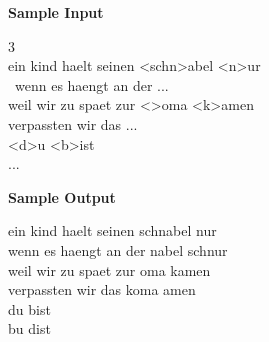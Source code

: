 \begin{flushleft}
{\color{red} \textbf{Sample Input}}
\end{flushleft}
\begin{flushleft}
3\\
ein kind haelt seinen \textless schn\textgreater abel \textless n\textgreater ur\\\
wenn es haengt an der ...\\
weil wir zu spaet zur \textless \textgreater oma \textless k\textgreater amen\\
verpassten wir das ...\\
\textless d\textgreater u \textless b\textgreater ist\\
...\\
\end{flushleft}

\begin{flushleft}
{\color{red} \textbf{Sample Output}}
\end{flushleft}
\begin{flushleft}
ein kind haelt seinen schnabel nur\\
wenn es haengt an der nabel schnur\\
weil wir zu spaet zur oma kamen\\
verpassten wir das koma amen\\
du bist\\
bu dist\\
\end{flushleft}

\newpage